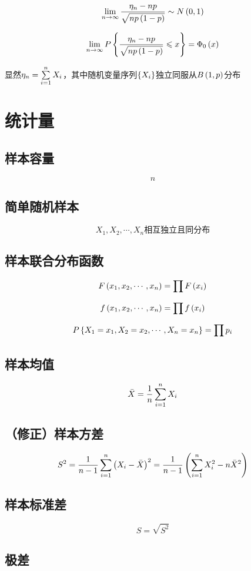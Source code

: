 \documentclass{article}
\begin{document}
\[\lim_{n\to\infty}\frac{\eta_n-np}{\sqrt{np\left(1-p\right)}}\sim N\left(0,1\right)\]

\[\lim_{n\to\infty}P\left\{\frac{\eta_n-np}{\sqrt{np\left(1-p\right)}}\leqslant x\right\}=\Phi_0\left(x\right)\]

显然$\eta_n=\sum\limits_{i=1}^n X_i$，其中随机变量序列$\left\{X_i\right\}$独立同服从$B\left(1,p\right)$分布

\section{统计量}

\subsection{样本容量}

\[n\]

\subsection{简单随机样本}

\[X_1,X_2,\cdots,X_n\text{相互独立且同分布}\]

\subsection{样本联合分布函数}

\[F\left(x_1,x_2,\cdots,x_n\right)=\prod F\left(x_i\right)\]

\[f\left(x_1,x_2,\cdots,x_n\right)=\prod f\left(x_i\right)\]

\[P\left\{X_1=x_1,X_2=x_2,\cdots,X_n=x_n\right\}=\prod p_i\]

\subsection{样本均值}

\[\bar X=\frac1n\sum\limits_{i=1}^n X_i\]

\subsection{（修正）样本方差}

\[S^2=\frac1{n-1}\sum\limits_{i=1}^n{\left(X_i-\bar X\right)}^2=\frac1{n-1}\left(\sum\limits_{i=1}^n X_i^2-n\bar X^2\right)\]

\subsection{样本标准差}

\[S=\sqrt{S^2}\]

\subsection{极差}
\end{document}
